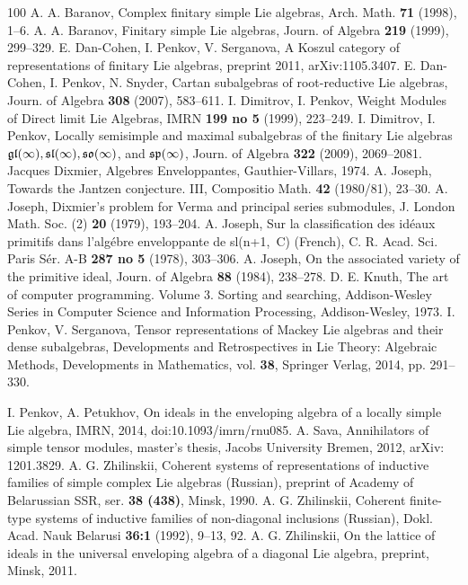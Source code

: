 \documentclass[10pt]{amsart}\oddsidemargin -1mm \evensidemargin -1mm \topmargin -15mm\headheight5mm \headsep 3.5mm \textheight 245mm\textwidth 170mm %
\theoremstyle{definition}\newtheorem{theorem}{Theorem}[section]\newtheorem{lemma}[theorem]{Lemma}\newtheorem{remark}[theorem]{Remark}\newtheorem{proposition}[theorem]{Proposition}\newtheorem{corollary}[theorem]{Corollary}\newtheorem{definition}[theorem]{Definition}\newtheorem{Ex}[theorem]{Example}
\begin{document}
\begin{thebibliography}{100}
 A. A. Baranov, Complex finitary simple Lie algebras, Arch. Math. {\bf 71} (1998), 1--6.
 A. A. Baranov, Finitary simple Lie algebras, Journ. of Algebra {\bf 219} (1999), 299--329.
 E. Dan-Cohen, I. Penkov, V. Serganova, A Koszul category of representations of finitary Lie algebras, preprint 2011, arXiv:1105.3407.
 E. Dan-Cohen, I. Penkov, N. Snyder, Cartan subalgebras of root-reductive Lie algebras, Journ. of Algebra {\bf 308} (2007), 583--611.
 I. Dimitrov, I. Penkov, Weight Modules of Direct limit Lie Algebras, IMRN {\bf 199 no 5} (1999), 223--249.
 I. Dimitrov, I. Penkov, Locally semisimple and maximal subalgebras of the finitary Lie algebras $\frak{gl}(\infty), \frak{sl}(\infty), \frak{so}(\infty)$, and $\frak{sp}(\infty)$, Journ. of Algebra {\bf 322} (2009), 2069--2081.
 Jacques Dixmier, Algebres Enveloppantes, Gauthier-Villars, 1974.
 A. Joseph, Towards the Jantzen conjecture. III, Compositio Math. {\bf 42} (1980/81), 23--30.
 A. Joseph, Dixmier's problem for Verma and principal series submodules, J. London Math. Soc. (2) {\bf 20} (1979), 193--204.
 A. Joseph, Sur la classification des id\'eaux primitifs dans l'alg\'ebre enveloppante de sl(n+1,~C) (French), C. R. Acad. Sci. Paris S\'er. A-B {\bf 287 no 5} (1978), 303--306.
 A. Joseph, On the associated variety of the primitive ideal, Journ. of Algebra {\bf88} (1984), 238--278.
 D. E. Knuth, The art of computer programming. Volume 3. Sorting and searching, Addison-Wesley Series in Computer Science and Information Processing,  Addison-Wesley, 1973.
  I. Penkov, V. Serganova, Tensor representations of Mackey Lie algebras and their dense subalgebras, Developments and Retrospectives in Lie Theory: Algebraic Methods, Developments in Mathematics, vol. {\bf 38}, Springer Verlag, 2014, pp. 291--330.

 I. Penkov, A. Petukhov, On ideals in the enveloping algebra of a locally simple Lie algebra, IMRN, 2014, doi:10.1093/imrn/rnu085.%
 A. Sava, Annihilators of simple tensor modules, master's thesis, Jacobs University Bremen, 2012, arXiv: 1201.3829.
 A. G. Zhilinskii, Coherent systems of representations of inductive families of simple complex Lie algebras (Russian), preprint of Academy of Belarussian SSR, ser. {\bf 38 (438)}, Minsk, 1990.
 A. G. Zhilinskii, Coherent finite-type systems of inductive families of non-diagonal inclusions (Russian), Dokl. Acad. Nauk Belarusi {\bf 36:1} (1992), 9--13, 92.
 A. G. Zhilinskii, On the lattice of ideals in the universal enveloping algebra of a diagonal Lie algebra, preprint, Minsk, 2011.
\end{thebibliography}
\end{document}
